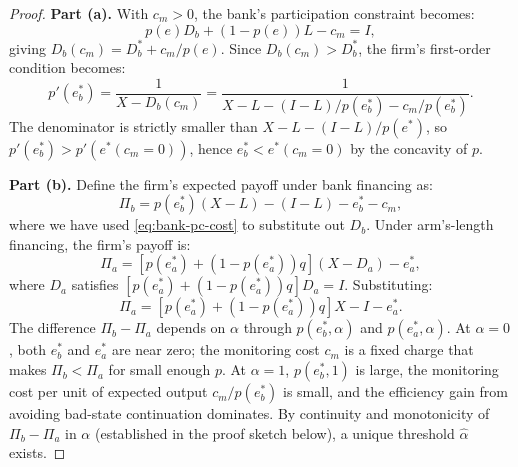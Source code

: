 \documentclass[12pt,a4paper]{article}
\theoremstyle{plain}
\theoremstyle{definition}
\theoremstyle{remark}
\begin{document}
\begin{proof}
\textbf{Part (a).} With $c_m > 0$, the bank's participation constraint becomes:
\begin{equation}
\label{eq:bank-pc-cost}
p(e) D_b + (1 - p(e)) L - c_m = I,
\end{equation}
giving $D_b(c_m) = D_b^* + c_m / p(e)$. Since $D_b(c_m) > D_b^*$, the firm's first-order condition becomes:
\begin{equation}
\label{eq:foc-cost}
p'(e_b^*) = \frac{1}{X - D_b(c_m)} = \frac{1}{X - L - (I - L)/p(e_b^*) - c_m/p(e_b^*)}.
\end{equation}
The denominator is strictly smaller than $X - L - (I-L)/p(e^*)$, so $p'(e_b^*) > p'(e^*(c_m=0))$, hence $e_b^* < e^*(c_m = 0)$ by the concavity of $p$.

\textbf{Part (b).} Define the firm's expected payoff under bank financing as:
\begin{equation}
\label{eq:payoff-bank}
\Pi_b = p(e_b^*)(X - L) - (I - L) - e_b^* - c_m,
\end{equation}
where we have used \cref{eq:bank-pc-cost} to substitute out $D_b$. Under arm's-length financing, the firm's payoff is:
\begin{equation}
\label{eq:payoff-al}
\Pi_a = [p(e_a^*) + (1 - p(e_a^*))q](X - D_a) - e_a^*,
\end{equation}
where $D_a$ satisfies $[p(e_a^*) + (1-p(e_a^*))q]D_a = I$. Substituting:
\begin{equation}
\label{eq:payoff-al-sub}
\Pi_a = [p(e_a^*) + (1-p(e_a^*))q]X - I - e_a^*.
\end{equation}
The difference $\Pi_b - \Pi_a$ depends on $\alpha$ through $p(e_b^*, \alpha)$ and $p(e_a^*, \alpha)$. At $\alpha = 0$, both $e_b^*$ and $e_a^*$ are near zero; the monitoring cost $c_m$ is a fixed charge that makes $\Pi_b < \Pi_a$ for small enough $p$. At $\alpha = 1$, $p(e_b^*, 1)$ is large, the monitoring cost per unit of expected output $c_m / p(e_b^*)$ is small, and the efficiency gain from avoiding bad-state continuation dominates. By continuity and monotonicity of $\Pi_b - \Pi_a$ in $\alpha$ (established in the proof sketch below), a unique threshold $\hat{\alpha}$ exists.


\end{proof}
\end{document}
